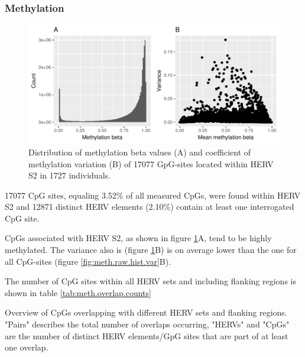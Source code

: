 \documentclass[a4paper,12pt,twoside,openright]{article}
\begin{document}
\subsubsection{Methylation}
\label{Results:Methylation}
\begin{figure}[tb]
	\includegraphics[scale = 1, keepaspectratio = true]{../figures/hervS2_meth_raw_hist_var}  
	\caption{Distribution of methylation beta values (A) and coefficient of methylation variation (B) of 17077 GpG-sites located within HERV S2 in 1727 individuals.}
    \label{fig:hervS2.meth.hist.var}
\end{figure}
17077 CpG sites, equaling 3.52\% of all measured CpGs, were found within HERV S2 and 12871 distinct HERV elements (2.10\%) contain at least one interrogated CpG site.

CpGs associated with HERV S2, as shown in figure \ref{fig:hervS2.meth.hist.var}A, tend to be highly methylated. The variance also is (figure \ref{fig:hervS2.meth.hist.var}B) is on average lower than the one for all CpG-sites (figure \ref{fig:meth.raw.hist.var}B).

The number of CpG sites within all HERV sets and including flanking regions is shown in table \ref{tab:meth.overlap.counts}

\begin{table}[h!]
  \begin{center}
  \end{center}        
	\caption{Overview of CpGs overlapping with different HERV sets and flanking regions. "Pairs" describes the total number of overlaps occurring, "HERVs" and "CpGs" are the number of distinct HERV elements/GpG sites that are part of at least one overlap.}
	\label{tab:meth.overlap.counts}
\end{table} 
\end{document}
